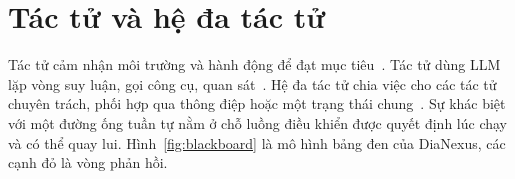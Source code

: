 
\section{Tác tử và hệ đa tác tử}

Tác tử cảm nhận môi trường và hành động để đạt mục tiêu~\cite{aima}. Tác tử dùng LLM lặp vòng suy luận, gọi công cụ, quan sát~\cite{react}. Hệ đa tác tử chia việc cho các tác tử chuyên trách, phối hợp qua thông điệp hoặc một trạng thái chung~\cite{wooldridge}. Sự khác biệt với một đường ống tuần tự nằm ở chỗ luồng điều khiển được quyết định lúc chạy và có thể quay lui. Hình~\ref{fig:blackboard} là mô hình bảng đen của DiaNexus, các cạnh đỏ là vòng phản hồi.

